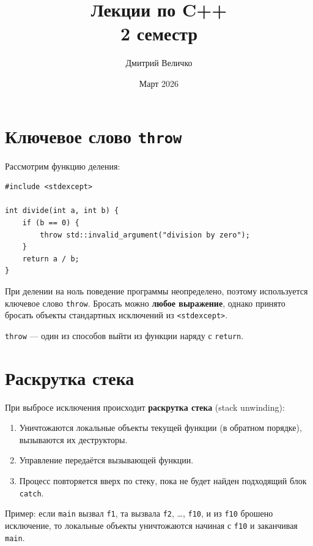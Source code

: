 \documentclass[a4paper,12pt]{article}
\title{\textbf{Лекции по C++}\\\large 2 семестр}
\author{Дмитрий Величко}
\date{Март 2026}
\begin{document}
\maketitle
\tableofcontents
\newpage

\section{Ключевое слово \texttt{throw}}

Рассмотрим функцию деления:

\begin{lstlisting}
#include <stdexcept>

int divide(int a, int b) {
    if (b == 0) {
        throw std::invalid_argument("division by zero");
    }
    return a / b;
}
\end{lstlisting}

При делении на ноль поведение программы неопределено, поэтому используется
ключевое слово \texttt{throw}. Бросать можно \textbf{любое выражение},
однако принято бросать объекты стандартных исключений из
\texttt{<stdexcept>}.

\texttt{throw} --- один из способов выйти из функции наряду с
\texttt{return}.

\section{Раскрутка стека}

При выбросе исключения происходит \textbf{раскрутка стека} (stack
unwinding):

\begin{enumerate}
    \item Уничтожаются локальные объекты текущей функции
          (в обратном порядке), вызываются их деструкторы.
    \item Управление передаётся вызывающей функции.
    \item Процесс повторяется вверх по стеку, пока не будет найден
          подходящий блок \texttt{catch}.
\end{enumerate}

Пример: если \texttt{main} вызвал \texttt{f1}, та вызвала
\texttt{f2}, \ldots, \texttt{f10}, и из \texttt{f10} брошено
исключение, то локальные объекты уничтожаются начиная с \texttt{f10}
и заканчивая \texttt{main}.

\end{document}
